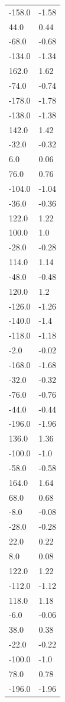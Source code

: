 \begin{longtable}{ll}
-158.0 & -1.58 \\
44.0 & 0.44 \\
-68.0 & -0.68 \\
-134.0 & -1.34 \\
162.0 & 1.62 \\
-74.0 & -0.74 \\
-178.0 & -1.78 \\
-138.0 & -1.38 \\
142.0 & 1.42 \\
-32.0 & -0.32 \\
6.0 & 0.06 \\
76.0 & 0.76 \\
-104.0 & -1.04 \\
-36.0 & -0.36 \\
122.0 & 1.22 \\
100.0 & 1.0 \\
-28.0 & -0.28 \\
114.0 & 1.14 \\
-48.0 & -0.48 \\
120.0 & 1.2 \\
-126.0 & -1.26 \\
-140.0 & -1.4 \\
-118.0 & -1.18 \\
-2.0 & -0.02 \\
-168.0 & -1.68 \\
-32.0 & -0.32 \\
-76.0 & -0.76 \\
-44.0 & -0.44 \\
-196.0 & -1.96 \\
136.0 & 1.36 \\
-100.0 & -1.0 \\
-58.0 & -0.58 \\
164.0 & 1.64 \\
68.0 & 0.68 \\
-8.0 & -0.08 \\
-28.0 & -0.28 \\
22.0 & 0.22 \\
8.0 & 0.08 \\
122.0 & 1.22 \\
-112.0 & -1.12 \\
118.0 & 1.18 \\
-6.0 & -0.06 \\
38.0 & 0.38 \\
-22.0 & -0.22 \\
-100.0 & -1.0 \\
78.0 & 0.78 \\
-196.0 & -1.96 \\

\end{longtable}
